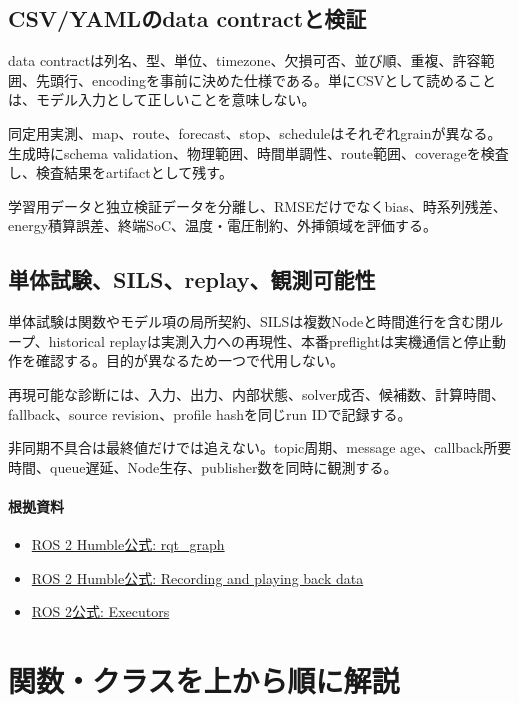\documentclass[a4paper,11pt]{article}
\begin{document}
\subsection{CSV/YAMLのdata contractと検証}
data contractは列名、型、単位、timezone、欠損可否、並び順、重複、許容範囲、先頭行、encodingを事前に決めた仕様である。単にCSVとして読めることは、モデル入力として正しいことを意味しない。


同定用実測、map、route、forecast、stop、scheduleはそれぞれgrainが異なる。生成時にschema validation、物理範囲、時間単調性、route範囲、coverageを検査し、検査結果をartifactとして残す。


学習用データと独立検証データを分離し、RMSEだけでなくbias、時系列残差、energy積算誤差、終端SoC、温度・電圧制約、外挿領域を評価する。



\subsection{単体試験、SILS、replay、観測可能性}
単体試験は関数やモデル項の局所契約、SILSは複数Nodeと時間進行を含む閉ループ、historical replayは実測入力への再現性、本番preflightは実機通信と停止動作を確認する。目的が異なるため一つで代用しない。


再現可能な診断には、入力、出力、内部状態、solver成否、候補数、計算時間、fallback、source revision、profile hashを同じrun IDで記録する。


非同期不具合は最終値だけでは追えない。topic周期、message age、callback所要時間、queue遅延、Node生存、publisher数を同時に観測する。

\paragraph{根拠資料}
\begin{itemize}[leftmargin=1.6em]
\item \href{https://docs.ros.org/en/ros2_packages/humble/api/rqt_graph/index.html}{ROS 2 Humble公式: rqt\_graph}
\item \href{https://docs.ros.org/en/humble/Tutorials/Beginner-CLI-Tools/Recording-And-Playing-Back-Data/Recording-And-Playing-Back-Data.html}{ROS 2 Humble公式: Recording and playing back data}
\item \href{https://docs.ros.org/en/rolling/Concepts/Intermediate/About-Executors.html}{ROS 2公式: Executors}
\end{itemize}



        \section{関数・クラスを上から順に解説}
\end{document}
